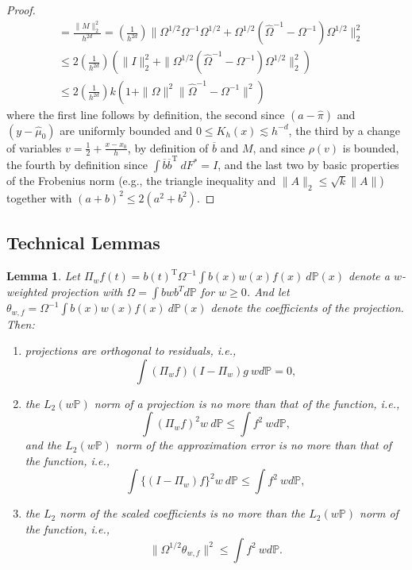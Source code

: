 \documentclass[11pt,twoside]{article}
\def\T{{ \mathrm{\scriptscriptstyle T} }}
\newcommand{\Pb}{\mathbb{P}}
\newcommand{\one}{\mathbbold{1}}
\newtheorem{applemma}{Lemma}
\theoremstyle{definition}
\theoremstyle{remark}
\begin{document}
\begin{proof}
\begin{align*}
&=  \frac{\| M \|_2^2}{h^{2d}} 
= \left( \frac{1}{h^{2d}} \right)  \|  \Omega^{1/2} \Omega^{-1} \Omega^{1/2} + \Omega^{1/2} (\widehat\Omega^{-1} - \Omega^{-1}) \Omega^{1/2} \|_2^2 \\
& \leq 2\left( \frac{1}{h^{2d}} \right)  \left(  \| I \|_2^2 + \| \Omega^{1/2} (\widehat\Omega^{-1} - \Omega^{-1}) \Omega^{1/2} \|_2^2 \right) \\
& \leq 2\left( \frac{1}{h^{2d}} \right) k \left( 1 + \| \Omega \|^2 \| \widehat\Omega^{-1} - \Omega^{-1} \|^2 \right)
\end{align*}
where the first line follows by definition,  the second since $(a-\widehat\pi)$ and $(y-\widehat\mu_0)$ are uniformly bounded and $0 \leq K_h(x) \lesssim h^{-d}$, the third by a change of variables $v=\frac{1}{2} + \frac{x-x_0}{h}$, by definition of $\overline{b}$ and $M$, and since $\rho(v)$ is bounded, the fourth by definition since $\int \overline{b} \overline{b}^\T \ dF^*=I$, and the last two by basic properties of the Frobenius norm (e.g., the triangle inequality and $\| A \|_2 \leq \sqrt{k} \| A \|$) together with  $(a + b)^2 \leq 2(a^2 + b^2)$. 
\end{proof}

\bigskip

\subsection{Technical Lemmas}

\begin{applemma} \label{lem:projections}
Let $\Pi_w f(t) = b(t)^\T \Omega^{-1} \int b(x) w(x) f(x) \ d\Pb(x)$ denote a $w$-weighted projection with $\Omega = \int b w b^T d\Pb$ for $w \geq 0$. And let $\theta_{w,f} = \Omega^{-1} \int b(x) w(x) f(x) \ d\Pb(x)$ denote the coefficients of the projection. Then:
\begin{enumerate}
\item[(i)] projections are orthogonal to residuals, i.e., 
$$ \int (\Pi_w f) (I-\Pi_w) g \ w d\Pb = 0 , $$
\item[(ii)] the $L_2(w\Pb)$ norm of a projection is no more than that of the function, i.e., 
$$ \int (\Pi_w f)^2 w \ d\Pb \leq \int f^2 \ w d\Pb , $$
and the $L_2(w\Pb)$ norm of the approximation error is no more than that of the function, i.e.,
$$ \int \{(I-\Pi_w) f\}^2 w \ d\Pb \leq \int f^2 \ w d\Pb , $$
\item[(iii)] the $L_2$ norm of the scaled coefficients is no more than the $L_2(w\Pb)$ norm of the function, i.e., 
$$ \| \Omega^{1/2} \theta_{w,f} \|^2 \leq \int f^2 \ wd\Pb . $$
\end{enumerate}
\end{applemma}
\end{document}
